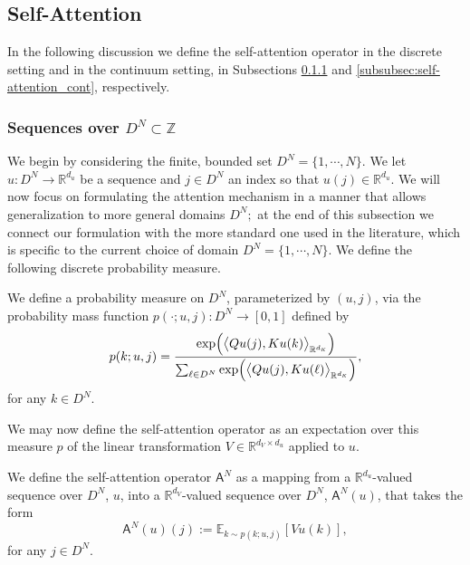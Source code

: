 \documentclass[twoside]{article}
\newcommand{\1}{\mathbbm{1}}
\newcommand{\R}{\mathbbm{R}}
\newcommand{\Z}{\mathbbm{Z}}
\newcommand{\sA}{\mathsf{A}}
\newcommand{\dK}{d_\textrm{\scalebox{.7}{$K$}}}
\providecommand{\mathbbm}{\mathbb} %
\newcommand{\E}{\mathbb{E}}
\begin{document}
\subsection{Self-Attention}
\label{subsec:self-attention}

In the following discussion we define the self-attention operator in the discrete setting and in the continuum setting, in Subsections \ref{subsubsec:self-attention_discrete} and \ref{subsubsec:self-attention_cont}, respectively. 

\subsubsection{Sequences over \texorpdfstring{$D^N \subset \Z$}{}}
\label{subsubsec:self-attention_discrete}

We begin by considering the finite, bounded set $D^N= \{1, \cdots, N\}.$ We let $u: D^N \to \R^{d_u}$ be a sequence and $j \in D^N$ an index so that $u(j)\in \R^{d_u}$. 
We will now focus on formulating the attention mechanism in a manner that allows generalization
to more general domains $D^N;$ at the end of this subsection we connect our formulation with
the more standard one used in the literature, which is specific to the current choice of
domain $D^N= \{1, \cdots, N\}.$ We define the following discrete probability measure.

\begin{definition}
\label{d:1}
We define a probability measure on $D^N$, parameterized by $(u,j)$, via the probability mass function $p(\cdot;u,j): D^N \to [0,1]$ defined by
\[p(k; u, j) = \frac{\mathrm{exp} \Big ( \big\langle Q u(j), K u(k) \big\rangle_{\R^{\dK}} \Big )}{\sum_{\ell \in D^N} \mathrm{exp} \Big ( \big\langle Q u(j), K u(\ell) \big\rangle_{\R^{\dK}} \Big )},\]
for any $k \in D^N$.
\end{definition} 




We may now define the self-attention operator as an expectation over this measure $p$ of the linear transformation $V\in \R^{d_V\times d_u}$ applied to $u$.


\begin{definition}
\label{d:2}
We define the self-attention operator $\sA^N$ as a mapping from a $\R^{d_u}$-valued sequence over $D^N$, $u$, into a $\R^{d_V}$-valued sequence over $D^N$, $\sA^N(u)$, that takes the form
\[\sA^N(u)(j):=  \E_{k \sim p(k;u,j)} [Vu(k)],\]
for any $j\in D^N$.
\end{definition}
\end{document}
